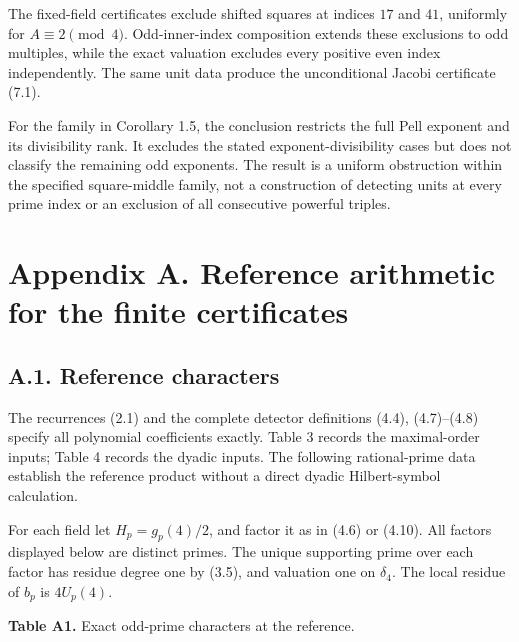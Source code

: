 \documentclass[11pt,a4paper]{article}
\begin{document}
The fixed-field certificates exclude shifted squares at indices \(17\)
and \(41\), uniformly for \(A\equiv2\pmod4\). Odd-inner-index
composition extends these exclusions to odd multiples, while the exact
valuation excludes every positive even index independently. The same
unit data produce the unconditional Jacobi certificate (7.1).

For the family in Corollary 1.5, the conclusion restricts the full Pell
exponent and its divisibility rank. It excludes the stated
exponent-divisibility cases but does not classify the remaining odd
exponents. The result is a uniform obstruction within the specified
square-middle family, not a construction of detecting units at every
prime index or an exclusion of all consecutive powerful triples.

\section{Appendix A. Reference arithmetic for the finite
certificates}\label{reference-arithmetic}

\subsection{A.1. Reference characters}\label{reference-characters}

The recurrences (2.1) and the complete detector definitions (4.4),
(4.7)--(4.8) specify all polynomial coefficients exactly. Table 3
records the maximal-order inputs; Table 4 records the dyadic inputs. The
following rational-prime data establish the reference product without a
direct dyadic Hilbert-symbol calculation.

For each field let \(H_p=g_p(4)/2\), and factor it as in (4.6) or
(4.10). All factors displayed below are distinct primes. The unique
supporting prime over each factor has residue degree one by (3.5), and
valuation one on \(\delta_4\). The local residue of \(b_p\) is
\(4U_p(4)\).

\textbf{Table A1.} Exact odd-prime characters at the reference.
\end{document}
